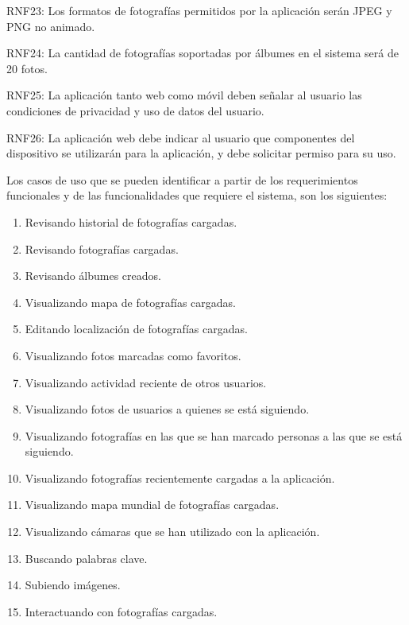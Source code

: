 \documentclass{memoria}
\begin{document}
RNF23: Los formatos de fotografías permitidos por la aplicación serán JPEG y PNG no animado.

RNF24: La cantidad de fotografías soportadas por álbumes en el sistema será de 20 fotos.

RNF25: La aplicación tanto web como móvil deben señalar al usuario las condiciones de privacidad y uso de datos del usuario.

RNF26: La aplicación web debe indicar al usuario que componentes del dispositivo se utilizarán para la aplicación, y debe solicitar permiso para su uso.



Los casos de uso que se pueden identificar a partir de los requerimientos funcionales y de las funcionalidades que requiere el sistema, son los siguientes:

\begin{enumerate}
    \item Revisando historial de fotografías cargadas.
    \item Revisando fotografías cargadas.
    \item Revisando álbumes creados.
    \item Visualizando mapa de fotografías cargadas.
    \item Editando localización de fotografías cargadas.
    \item Visualizando fotos marcadas como favoritos.
    \item Visualizando actividad reciente de otros usuarios.
    \item Visualizando fotos de usuarios a quienes se está siguiendo.
    \item Visualizando fotografías en las que se han marcado personas a las que se está siguiendo.
    \item Visualizando fotografías recientemente cargadas a la aplicación.
    \item Visualizando mapa mundial de fotografías cargadas.
    \item Visualizando cámaras que se han utilizado con la aplicación.
    \item Buscando palabras clave.
    \item Subiendo imágenes.
    \item Interactuando con fotografías cargadas.
\end{enumerate}
\newpage
\end{document}
